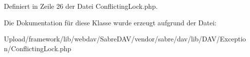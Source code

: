 Definiert in Zeile 26 der Datei Conflicting\+Lock.\+php.



Die Dokumentation für diese Klasse wurde erzeugt aufgrund der Datei\+:\begin{DoxyCompactItemize}
\item 
Upload/framework/lib/webdav/\+Sabre\+D\+A\+V/vendor/sabre/dav/lib/\+D\+A\+V/\+Exception/Conflicting\+Lock.\+php\end{DoxyCompactItemize}
